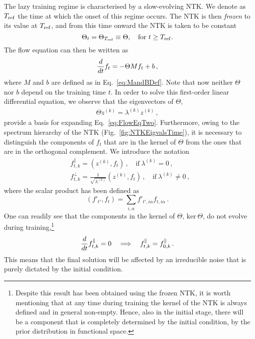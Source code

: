 The lazy training regime is characterised by a slow-evolving NTK. We denote as
$T_{\rm ref}$ the time at which the onset of this regime occurs. The NTK is then
\textit{frozen} to its value at $T_{\rm ref}$, and from this time onward the NTK
is taken to be constant
\begin{equation}
  \Theta_t = \Theta_{T_{\rm ref}} \equiv \Theta, \quad \textrm{for } t \geq T_{\rm ref}.
\end{equation} 
The flow equation can then be written as
\begin{align}
  \frac{d}{dt} f_t = -\Theta M f_t + b\, ,
  \label{eq:FlowEqTwo}
\end{align}
where $M$ and $b$ are defined as in Eq.~\eqref{eq:MandBDef}. Note that now
neither $\Theta$ nor $b$ depend on the training time $t$. In order to solve this
first-order linear differential equation, we observe that the eigenvectors of
$\Theta$,
\begin{align}
    \label{eq:ThetaEigensystem}
    \Theta z^{(k)} = \lambda^{(k)} z^{(k)}\, ,
\end{align}
provide a basis for expanding Eq.~\eqref{eq:FlowEqTwo}. Furthermore, owing to
the spectrum hierarchy of the NTK (Fig.~\ref{fig:NTKEigvalsTime}), it is
necessary to distinguish the components of $f_t$ that are in the kernel of
$\Theta$ from the ones that are in the orthogonal complement. We introduce the
notation
\begin{align}
    \label{eq:ParallelCompnents}
    &f^\parallel_{t,k} = \left(z^{(k)}, f_t\right)\, , \quad \text{if}\ \lambda^{(k)} = 0\, , \\
    \label{eq:OrthogonalComponents}
    &f^\perp_{t,k} = \frac{1}{\sqrt{\lambda^{(k)}}} \left(z^{(k)}, f_t\right)\, , \quad
        \text{if}\ \lambda^{(k)} \neq 0\, ,
\end{align}
where the scalar product has been defined as
\begin{equation}
  \left(f'_{t'}, f_t\right) = \sum_{i,\alpha} f'_{t',i\alpha} f_{t,i\alpha}\,.
\end{equation}
One can readily see that the components in the kernel of $\Theta$, $\text{ker}\
\Theta$, do not evolve during training,\footnote{Despite this result has been
obtained using the frozen NTK, it is worth mentioning that at any time during
training the kernel of the NTK is always defined and in general non-empty.
Hence, also in the initial stage, there will be a component that is completely
determined by the initial condition, \ie by the prior distribution in functional
space.}
\begin{align}
    \label{eq:FlowParallel}
    \frac{d}{dt} f^\parallel_{t,k} = 0
        \quad \Longrightarrow \quad f^\parallel_{t,k} = f^\parallel_{0,k}\, .
\end{align}
This means that the final solution will be affected by an irreducible noise that
is purely dictated by the initial condition. 

